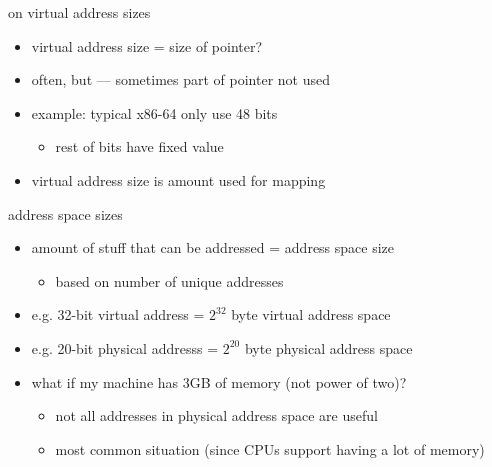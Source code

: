 \begin{frame}{on virtual address sizes}
    \begin{itemize}
    \item virtual address size = size of pointer?
    \vspace{.5cm}
    \item often, but --- sometimes part of pointer not used
    \item example: typical x86-64 only use 48 bits
        \begin{itemize}
        \item rest of bits have fixed value
        \end{itemize}
    \item virtual address size is amount used for mapping
    \end{itemize}
\end{frame}

\begin{frame}{address space sizes}
\begin{itemize}
    \item amount of stuff that can be addressed = address space size
        \begin{itemize}
        \item based on number of unique addresses
        \end{itemize}
    \item e.g. 32-bit virtual address = $2^{32}$ byte virtual address space
    \item e.g. 20-bit physical addresss = $2^{20}$ byte physical address space
    \vspace{.5cm}
    \item<2-> what if my machine has 3GB of memory (not power of two)?
        \begin{itemize}
        \item not all addresses in physical address space are useful
        \item most common situation (since CPUs support having a lot of memory)
        \end{itemize}
\end{itemize}
\end{frame}
